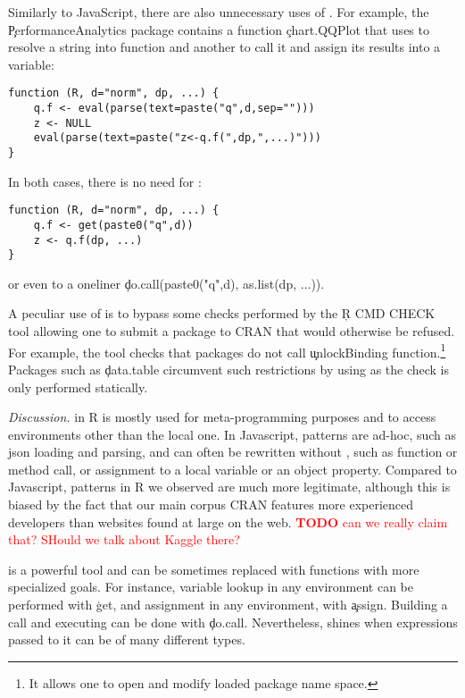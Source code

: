 \documentclass[review,screen,acmsmall,anonymous=true]{acmart}
\newcommand{\mypara}[1]{\medskip\noindent\emph{#1}\xspace}
\newcommand{\authorcomment}[3]{\xspace\textcolor{#1}{{\bf #2} #3}\xspace}
\newcommand{\todo}[1]{\authorcomment{red}{TODO}{#1}}
\begin{document}
Similarly to JavaScript, there are also unnecessary uses of \eval. For example,
the \c{PerformanceAnalytics} package contains a function \c{chart.QQPlot} that
uses \eval to resolve a string into function and another to call it and assign
its results into a variable:
\begin{lstlisting}
function (R, d="norm", dp, ...) {
	q.f <- eval(parse(text=paste("q",d,sep="")))
	z <- NULL
	eval(parse(text=paste("z<-q.f(",dp,",...)")))
}
\end{lstlisting}
  In both cases, there is no need for \eval:
\begin{lstlisting}
function (R, d="norm", dp, ...) {
	q.f <- get(paste0("q",d))
	z <- q.f(dp, ...)
}
\end{lstlisting}
or even to a oneliner \c{do.call(paste0("q",d), as.list(dp, ...))}.


    A peculiar use of \eval is to bypass some checks performed by the \c{R CMD
      CHECK} tool allowing one to submit a package to CRAN that would otherwise
      be refused. For example, the tool checks that packages do not call
      \c{unlockBinding} function.\footnote{It allows one to open and modify
      loaded package name space.} Packages such as \c{data.table} circumvent
      such restrictions by using \eval as the check is only performed
      statically.

\mypara{Discussion.} \Eval in R is mostly used for meta-programming purposes and to access environments other than the local one. In Javascript, patterns are ad-hoc, such as json loading and parsing, and can often be rewritten without \eval, such as function or method call, or assignment to a local variable or an object property. Compared to Javascript, \eval patterns in R we observed are much more legitimate, although this is biased by the fact that our main corpus CRAN features more experienced developers than  websites found at large on the web. \todo{can we really claim that? SHould we talk about Kaggle there?}

\eval is a powerful tool and can be sometimes replaced with functions with more specialized goals. For instance, variable lookup in any environment can be performed with \c{get}, and assignment in any environment, with \c{assign}. Building a call and executing can be done with \c{do.call}. Nevertheless, \eval shines when expressions passed to it can be of many different types. %
\end{document}
